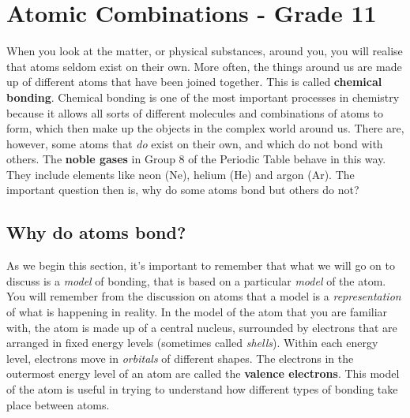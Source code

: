 \chapter{Atomic Combinations - Grade 11}
\label{chap:bonding}

When you look at the matter, or physical substances, around you, you will realise that atoms seldom exist on their own. More often, the things around us are made up of different atoms that have been joined together. This is called \textbf{chemical bonding}. Chemical bonding is one of the most important processes in chemistry because it allows all sorts of different molecules and combinations of atoms to form, which then make up the objects in the complex world around us. There are, however, some atoms that \textit{do} exist on their own, and which do not bond with others. The \textbf{noble gases} in Group 8 of the Periodic Table behave in this way. They include elements like neon (Ne), helium (He) and argon (Ar). The important question then is, why do some atoms bond but others do not?



\section{Why do atoms bond?}
\label{sec:bonding:why do atoms bond}

As we begin this section, it's important to remember that what we will go on to discuss is a \textit{model} of bonding, that is based on a particular \textit{model} of the atom. You will remember from the discussion on atoms 
that a model is a \textit{representation} of what is happening in reality. In the model of the atom that you are familiar with, the atom is made up of a central nucleus, surrounded by electrons that are arranged in fixed energy levels (sometimes called \textit{shells}). Within each energy level, electrons move in \textit{orbitals} of different shapes. The electrons in the outermost energy level of an atom are called the \textbf{valence electrons}. This model of the atom is useful in trying to understand how different types of bonding take place between atoms.\\

